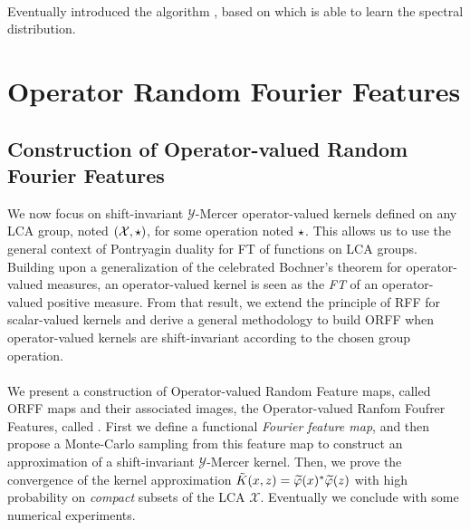 \documentclass[twoside,11pt]{article}
\begin{document}
\paragraph{}
Eventually \citet{Yang2015} introduced the algorithm , based
on  which is able to learn the spectral distribution.


\section{Operator Random Fourier Features}
\label{sec:ORFF_construction}

\subsection{Construction of Operator-valued Random Fourier Features}
We now focus on
shift-invariant $\mathcal{Y}$-Mercer operator-valued kernels defined on any
\acf{LCA} group, noted $(\mathcal{X}, \star)$, for some operation noted
$\star$. This allows us to use the general context of Pontryagin duality for
\acl{FT} of functions on \acs{LCA} groups. Building upon a generalization of
the celebrated Bochner's theorem for operator-valued measures, an
operator-valued kernel is seen as the \emph{\acl{FT}} of an operator-valued
positive measure. From that result, we extend the principle of \acs{RFF} for
scalar-valued kernels and derive a general methodology to build \acs{ORFF} when
operator-valued kernels are shift-invariant according to the chosen group
operation. 
\paragraph{}
We present a construction of Operator-valued Random Feature maps, called \acs{ORFF maps} and their associated images, the Operator-valued Ranfom Foufrer Features, called  .
First we define a functional \emph{Fourier
feature map}, and then propose a Monte-Carlo sampling from this feature map to
construct an approximation of a shift-invariant $\mathcal{Y}$-Mercer kernel.
Then, we prove the convergence of the kernel approximation
$\tilde{K}(x,z)=\tildePhi{\omega}(x)^\adjoint \tildePhi{\omega}(z)$ with high
probability on \emph{compact} subsets of the \acs{LCA} $\mathcal{X}$.
Eventually we conclude with some numerical experiments.
\end{document}
